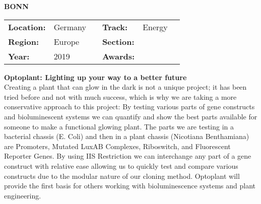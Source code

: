 \textbf{\uppercase{Bonn}}
\FloatBarrier
\begin{table}[h]
\begin{tabular}{lp{2.5cm}llll}
\textbf{Location:} & Germany & \multicolumn{1}{|l}{} & \textbf{Track:}   & Energy \\
\textbf{Region:}   & Europe   & \multicolumn{1}{|l}{} & \textbf{Section:} &  \\
\textbf{Year:}     & 2019   & \multicolumn{1}{|l}{} & \textbf{Awards:}  &
\end{tabular}
\end{table}
\FloatBarrier
\noindent	\textbf{Optoplant: Lighting up your way to a better future} \vspace{.2cm}\\
Creating a plant that can glow in the dark is not a unique project; it has been tried before and not with much success, which is why we are taking a more conservative approach to this project: By testing various parts of gene constructs and bioluminescent systems we can quantify and show the best parts available for someone to make a functional glowing plant.
The parts we are testing in a bacterial chassis (E. Coli) and then in a plant chassis (Nicotiana Benthamiana) are Promoters, Mutated LuxAB Complexes, Riboswitch, and Fluorescent Reporter Genes. By using IIS Restriction we can interchange any part of a gene construct with relative ease allowing us to quickly test and compare various constructs due to the modular nature of our cloning method.
Optoplant will provide the first basis for others working with bioluminescence systems and plant engineering.
\vspace{2cm} $ $
\pagebreak




